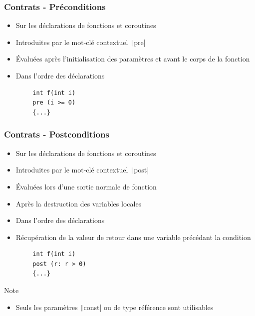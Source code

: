 \documentclass[C++.tex]{subfiles}
\begin{document}
\begin{frame}[fragile]
	\frametitle{Contrats - Préconditions}
	\begin{itemize}
		\item Sur les déclarations de fonctions et coroutines
		\item Introduites par le mot-clé contextuel \texttt|pre|
		\item Évaluées après l'initialisation des paramètres et avant le corps de la fonction
		\item Dans l'ordre des déclarations
	\end{itemize}

	\begin{verbatim}
		int f(int i)
		pre (i >= 0)
		{...}
	\end{verbatim}
\end{frame}

\begin{frame}[fragile]
	\frametitle{Contrats - Postconditions}
	\begin{itemize}
		\item Sur les déclarations de fonctions et coroutines
		\item Introduites par le mot-clé contextuel \texttt|post|
		\item Évaluées lors d'une sortie normale de fonction
		\item Après la destruction des variables locales
		\item Dans l'ordre des déclarations
		\item Récupération de la valeur de retour dans une variable précédant la condition
	\end{itemize}

	\begin{verbatim}
		int f(int i)
		post (r: r > 0)
		{...}
	\end{verbatim}

	\begin{block}{Note}
		\begin{itemize}
			\item Seuls les paramètres \texttt|const| ou de type référence sont utilisables
		\end{itemize}
	\end{block}
\end{frame}
\end{document}
